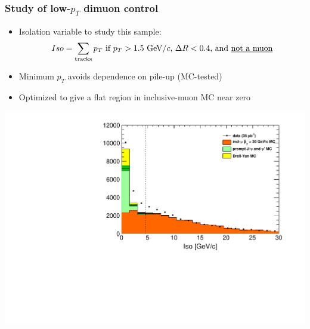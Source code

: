\documentclass[compress]{beamer}
\newcommand{\s}[1]{{\mbox{\scriptsize #1}}}
\begin{document}
\begin{frame}
\frametitle{Study of low-$p_T$ dimuon control}

\begin{itemize}
\item Isolation variable to study this sample:
\[ Iso = \sum_\s{tracks} p_T \mbox{ if } p_T > 1.5\mbox{ GeV/$c$, } \Delta R < 0.4 \mbox{, and \underline{not a muon}} \]

\item Minimum $p_T$ avoids dependence on pile-up (MC-tested)

\item Optimized to give a flat region in inclusive-muon MC near zero
\end{itemize}

\begin{center}
\includegraphics[width=0.75\linewidth]{lowdimuon_iso_everything.pdf}
\end{center}
\end{frame}
\end{document}
